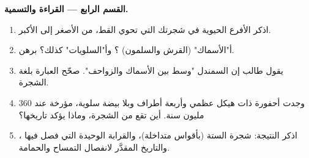 \begin{problem}
\medskip
\noindent\textbf{القسم الرابع --- القراءة والتسمية.}
\begin{enumerate}[resume]
  \item اذكر الأفرع الحيوية في شجرتك التي تحوي القط، من الأصغر إلى
        الأكبر.
  \item أ"الأسماك" (القرش والسلمون) ؟ وأ"السلويات" كذلك؟ برهن.
  \item يقول طالب إن السمندل "وسط بين الأسماك والزواحف". صحّح العبارة
        بلغة الشجرة.
  \item وجدت أحفورة ذات هيكل عظمي وأربعة أطراف وبلا بيضة سلوية، مؤرخة
        عند 360 مليون سنة. أين تقع من الشجرة، وماذا يؤكد تاريخها؟
  \item اذكر النتيجة: شجرة  الستة (بأقواس متداخلة)، والقرابة
        الوحيدة التي فصل فيها ، والتاريخ المقدَّر لانفصال التمساح
        والحمامة.
\end{enumerate}
\end{problem}
